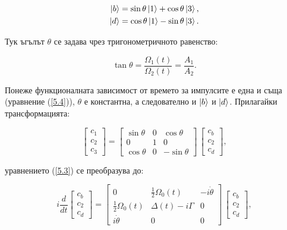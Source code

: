     \begin{subequations}
        \begin{align}
            \ket{b} = \sin\theta\ket{1} + \cos\theta\ket{3},\\
            \ket{d} = \cos\theta\ket{1} - \sin\theta\ket{3}.
        \end{align}
    \end{subequations}

    Тук ъгълът $\theta$ се задава чрез тригонометричното равенство:

    \begin{equation}
        \tan\theta = \frac{\Omega_1(t)}{\Omega_2(t)} = \frac{A_1}{A_2}.
    \end{equation}

    Понеже функционалната зависимост от времето за импулсите е една и съща (уравнение (\ref{5.4})), $\theta$ е константна, а следователно и $\ket{b}$ и $\ket{d}$. Прилагайки трансформацията:

    \begin{equation} \label{5.7}
        \begin{bmatrix}
            c_1\\
            c_2\\
            c_3
        \end{bmatrix} = \begin{bmatrix}
            \sin\theta & 0 & \cos\theta\\
            0 & 1 & 0\\
            \cos\theta & 0 & -\sin\theta
        \end{bmatrix} \, \begin{bmatrix}
            c_b\\
            c_2\\
            c_d
        \end{bmatrix},
    \end{equation}

    уравнението (\ref{5.3}) се преобразува до:

    \begin{equation} \label{5.8}
        \textit{i}\frac{d}{dt}\begin{bmatrix}
            c_b\\
            c_2\\
            c_d
        \end{bmatrix} = \begin{bmatrix}
            0 & \frac{1}{2}\Omega_0(t) & -\textit{i}\dot{\theta} \\
            \frac{1}{2}\Omega_0(t) & \Delta(t)-\textit{i}\Gamma & 0 \\
            \textit{i}\dot{\theta} & 0 & 0
        \end{bmatrix} \, \begin{bmatrix}
            c_b\\
            c_2\\
            c_d
        \end{bmatrix},
    \end{equation}

